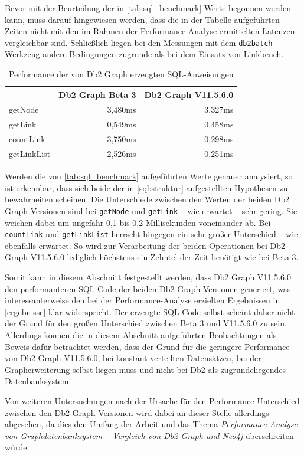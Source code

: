 Bevor mit der Beurteilung der in \autoref{tab:sql_benchmark} Werte begonnen werden kann, muss darauf hingewiesen werden, dass die in der Tabelle aufgeführten Zeiten nicht mit den im Rahmen der Performance-Analyse ermittelten Latenzen vergleichbar sind. Schließlich liegen bei den Messungen mit dem \texttt{db2batch}-Werkzeug andere Bedingungen zugrunde als bei dem Einsatz von Linkbench. 

\begin{table}[!ht]
    \centering
    \begin{tabular}{l|r|r}
    \hline
    \rowcolor[HTML]{EFEFEF} 
    \multicolumn{1}{c|}{\cellcolor[HTML]{EFEFEF}{\color[HTML]{333333} \textbf{SQL-Anweisung}}} & \multicolumn{1}{c|}{\cellcolor[HTML]{EFEFEF}\textbf{Db2 Graph Beta 3}} & \multicolumn{1}{c}{\cellcolor[HTML]{EFEFEF}\textbf{Db2 Graph V11.5.6.0}} \\ \hline
    getNode & 3,480ms & 3,327ms \\
    getLink & 0,549ms & 0,458ms \\
    countLink & 3,750ms & 0,298ms \\
    getLinkList & 2,526ms & 0,251ms \\ \hline
    \end{tabular}
    \caption{Performance der von Db2 Graph erzeugten SQL-Anweisungen}
    \label{tab:sql_benchmark}
\end{table}

Werden die von \autoref{tab:sql_benchmark} aufgeführten Werte genauer analysiert, so ist erkennbar, dass sich beide der in \autoref{sql:struktur} aufgestellten Hypothesen zu bewahrheiten scheinen. Die Unterschiede zwischen den Werten der beiden Db2 Graph Versionen sind bei \texttt{getNode} und \texttt{getLink} -- wie erwartet -- sehr gering. Sie weichen dabei um ungefähr 0,1 bis 0,2 Millisekunden voneinander ab. Bei \texttt{countLink} und \texttt{getLinkList} herrscht hingegen ein sehr großer Unterschied -- wie ebenfalls erwartet. So wird zur Verarbeitung der beiden Operationen bei Db2 Graph V11.5.6.0 lediglich höchstens ein Zehntel der Zeit benötigt wie bei Beta 3. 

Somit kann in diesem Abschnitt festgestellt werden, dass Db2 Graph V11.5.6.0 den performanteren SQL-Code der beiden Db2 Graph Versionen generiert, was interessanterweise den bei der Performance-Analyse erzielten Ergebnissen in \autoref{ergebnisse} klar widerspricht. Der erzeugte SQL-Code selbst scheint daher nicht der Grund für den großen Unterschied zwischen Beta 3 und V11.5.6.0 zu sein. Allerdings können die in diesem Abschnitt aufgeführten Beobachtungen als Beweis dafür betrachtet werden, dass der Grund für die geringere Performance von Db2 Graph V11.5.6.0, bei konstant verteilten Datensätzen, bei der Grapherweiterung selbst liegen muss und nicht bei Db2 als zugrundeliegendes Datenbanksystem. 

Von weiteren Untersuchungen nach der Ursache für den Performance-Unterschied zwischen den Db2 Graph Versionen wird dabei an dieser Stelle allerdings abgesehen, da dies den Umfang der Arbeit und das Thema \textit{Performance-Analyse von Graphdatenbanksystem -- Vergleich von Db2 Graph und Neo4j} überschreiten würde.